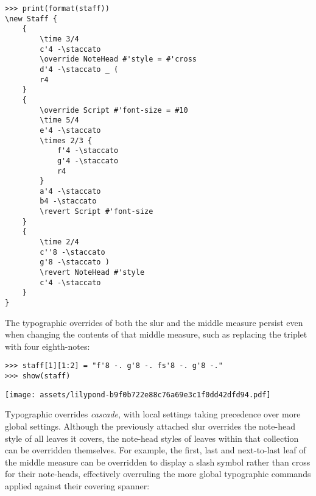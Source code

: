 \begin{comment}
<abjad>
print(format(staff))
</abjad>
\end{comment}

\begin{abjadbookoutput}
\begin{singlespacing}
\vspace{-0.5\baselineskip}
\begin{verbatim}
>>> print(format(staff))
\new Staff {
    {
        \time 3/4
        c'4 -\staccato
        \override NoteHead #'style = #'cross
        d'4 -\staccato _ (
        r4
    }
    {
        \override Script #'font-size = #10
        \time 5/4
        e'4 -\staccato
        \times 2/3 {
            f'4 -\staccato
            g'4 -\staccato
            r4
        }
        a'4 -\staccato
        b4 -\staccato
        \revert Script #'font-size
    }
    {
        \time 2/4
        c''8 -\staccato
        g'8 -\staccato )
        \revert NoteHead #'style
        c'4 -\staccato
    }
}
\end{verbatim}
\end{singlespacing}
\end{abjadbookoutput}

\noindent The typographic overrides of both the slur and the middle measure
persist even when changing the contents of that middle measure, such as
replacing the triplet with four eighth-notes:

\begin{comment}
<abjad>
staff[1][1:2] = "f'8 -. g'8 -. fs'8 -. g'8 -."
show(staff)
</abjad>
\end{comment}

\begin{abjadbookoutput}
\begin{singlespacing}
\vspace{-0.5\baselineskip}
\begin{verbatim}
>>> staff[1][1:2] = "f'8 -. g'8 -. fs'8 -. g'8 -."
>>> show(staff)
\end{verbatim}
\noindent\texttt{[image: assets/lilypond-b9f0b722e88c76a69e3c1f0dd42dfd94.pdf]}
\end{singlespacing}
\end{abjadbookoutput}

\noindent Typographic overrides \emph{cascade}, with local settings taking
precedence over more global settings. Although the previously attached slur
overrides the note-head style of all leaves it covers, the note-head styles of
leaves within that collection can be overridden themselves. For example, the
first, last and next-to-last leaf of the middle measure can be overridden to
display a slash symbol rather than cross for their note-heads, effectively
overruling the more global typographic commands applied against their covering
spanner:

